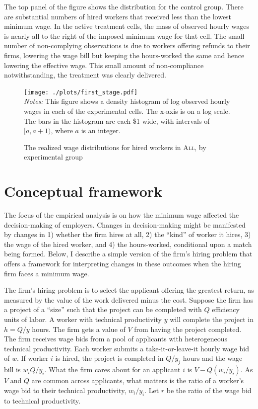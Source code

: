 \documentclass[AER]{AEA}
\newcommand{\all}{\textsc{All}}
\begin{document}
The top panel of the figure shows the distribution for the control group. 
There are substantial numbers of hired workers that received less than the lowest minimum wage.
In the active treatment cells, the mass of observed hourly wages is nearly all to the right of the imposed minimum wage for that cell.
The small number of non-complying observations is due to workers offering refunds to their firms, lowering the wage bill but keeping the hours-worked the same and hence lowering the effective wage.
This small amount of non-compliance notwithstanding, the treatment was clearly delivered.


\begin{figure}[h!]
  \caption{The realized wage distributions for hired workers in \all{}, by experimental group \label{fig:first_stage}}
  \centering
  \begin{minipage}{0.99\textwidth}
    \texttt{[image: ./plots/first\_stage.pdf]}
{\footnotesize \\
  \emph{Notes:} This figure shows a density histogram of log observed hourly wages in each of the experimental cells.
  The x-axis is on a log scale.
  The bars in the histogram are each \$1 wide, with intervals of $[a, a + 1)$, where $a$ is an integer. 
}
\end{minipage} 
\end{figure}

\section{Conceptual framework}  \label{sec:conceptual_framework}
The focus of the empirical analysis is on how the minimum wage affected the decision-making of employers.
Changes in decision-making might be manifested by changes in 
1) whether the firm hires at all,
2) the ``kind'' of worker it hires, 
3) the wage of the hired worker,
and 4) the hours-worked, conditional upon a match being formed. 
Below, I describe a simple version of the firm's hiring problem that offers a framework for interpreting changes in these outcomes when the hiring firm faces a minimum wage. 


The firm's hiring problem is to select the applicant offering the greatest return, as measured by the value of the work delivered minus the cost.
Suppose the firm has a project of a ``size'' such that the project can be completed with $Q$ efficiency units of labor.
A worker with technical productivity $y$ will complete the project in $h = Q/y$ hours.
The firm gets a value of $V$ from having the project completed.
The firm receives wage bids from a pool of applicants with heterogeneous technical productivity.
Each worker submits a take-it-or-leave-it hourly wage bid of $w$.
If worker $i$ is hired, the project is completed in $Q/y_j$ hours and the wage bill is $w_i Q/y_i$. 
What the firm cares about for an applicant $i$ is $V - Q (w_i/y_i)$.
As $V$ and $Q$ are common across applicants, what matters is the ratio of a worker's wage bid to their technical productivity, $w_i / y_i$.
Let $r$ be the ratio of the wage bid to technical productivity.
\end{document}
